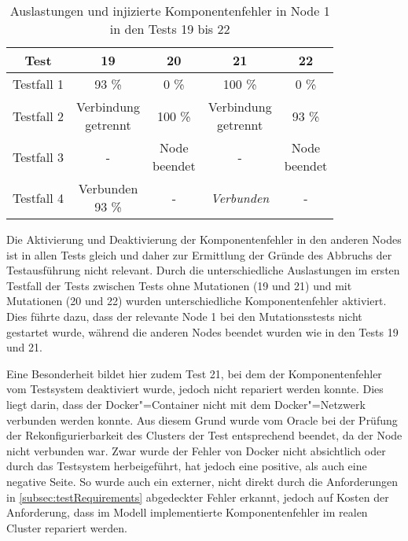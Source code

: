 \begin{table}[h]
    \begin{tabular}{c|cccc}
    	   Test    &                19                 &             20             &                21                 &             22             \\ \hline
    	Testfall 1 &               93 \%               &            0 \%            &              100 \%               &            0 \%            \\
    	Testfall 2 & \makecell{Verbindung \\ getrennt} &          100  \%           & \makecell{Verbindung \\ getrennt} &           93  \%           \\
    	Testfall 3 &                 -                 & \makecell{Node \\ beendet} &                 -                 & \makecell{Node \\ beendet} \\
    	Testfall 4 &   \makecell{Verbunden \\ 93 \%}   &             -              &         \emph{Verbunden}          &             -
    \end{tabular} 
    \caption{Auslastungen und injizierte Komponentenfehler in Node 1 in den Tests 19 bis 22}
    \label{tab:loadNode1Tests1922}
\end{table}

Die Aktivierung und Deaktivierung der Komponentenfehler in den anderen Nodes ist in allen Tests gleich und daher zur Ermittlung der Gründe des Abbruchs der Testausführung nicht relevant.
Durch die unterschiedliche Auslastungen im ersten Testfall der Tests zwischen Tests ohne Mutationen (19 und 21) und mit Mutationen (20 und 22) wurden unterschiedliche Komponentenfehler aktiviert.
Dies führte dazu, dass der relevante Node 1 bei den Mutationsstests nicht gestartet wurde, während die anderen Nodes beendet wurden wie in den Tests 19 und 21.

Eine Besonderheit bildet hier zudem Test 21, bei dem der Komponentenfehler vom Testsystem deaktiviert wurde, jedoch nicht repariert werden konnte.
Dies liegt darin, dass der Docker"=Container nicht mit dem Docker"=Netzwerk verbunden werden konnte.
Aus diesem Grund wurde vom Oracle bei der Prüfung der Rekonfigurierbarkeit des Clusters der Test entsprechend beendet, da der Node nicht verbunden war.
Zwar wurde der Fehler von Docker nicht absichtlich oder durch das Testsystem herbeigeführt, hat jedoch eine positive, als auch eine negative Seite.
So wurde auch ein externer, nicht direkt durch die Anforderungen in \cref{subsec:testRequirements} abgedeckter Fehler erkannt, jedoch auf Kosten der Anforderung, dass im Modell implementierte Komponentenfehler im realen Cluster repariert werden.

